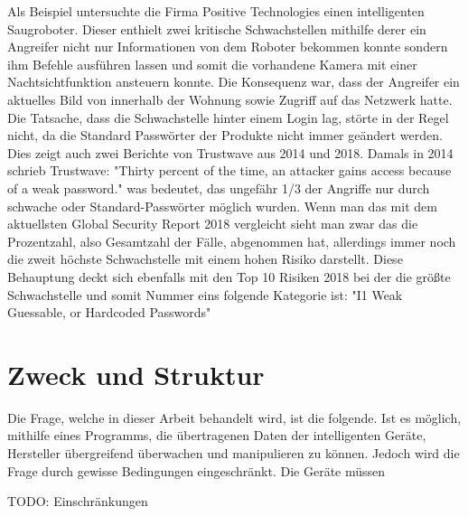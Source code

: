Als Beispiel untersuchte die Firma Positive Technologies einen intelligenten Saugroboter.
Dieser enthielt zwei kritische Schwachstellen mithilfe derer ein Angreifer nicht nur Informationen von dem Roboter bekommen konnte sondern ihm Befehle ausführen lassen und somit die vorhandene Kamera mit einer Nachtsichtfunktion ansteuern konnte. Die Konsequenz war, dass der Angreifer ein aktuelles Bild von innerhalb der Wohnung sowie Zugriff auf das Netzwerk hatte. Die Tatsache, dass die Schwachstelle hinter einem Login lag, störte in der Regel nicht, da die Standard Passwörter der Produkte nicht immer geändert werden.
Dies zeigt auch zwei Berichte von Trustwave aus 2014 und 2018.
Damals in 2014 schrieb Trustwave: "Thirty percent of the time, an attacker gains access because of a weak password."
was bedeutet, das ungefähr 1/3 der Angriffe nur durch schwache oder Standard-Passwörter möglich wurden. Wenn man das mit dem aktuellsten Global Security Report 2018 vergleicht sieht man zwar das die Prozentzahl, also Gesamtzahl der Fälle, abgenommen hat, allerdings immer noch die zweit höchste Schwachstelle mit einem hohen Risiko darstellt.
Diese Behauptung deckt sich ebenfalls mit den Top 10 Risiken 2018 bei der die größte Schwachstelle und somit Nummer eins folgende Kategorie ist: "I1 Weak Guessable, or Hardcoded Passwords" %


\section{Zweck und Struktur}
    Die Frage, welche in dieser Arbeit behandelt wird, ist die folgende.
    Ist es möglich, mithilfe eines Programms, die übertragenen Daten der intelligenten Geräte, Hersteller übergreifend überwachen und manipulieren zu können.
    Jedoch wird die Frage durch gewisse Bedingungen eingeschränkt.
    Die Geräte müssen 
    
    TODO: Einschränkungen
    
